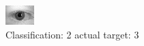 \begin{figure}[h!]
\begin{center}
\includegraphics[width=0.60\columnwidth]{figures/ID626_class_2_target_3.png}
\end{center}
\caption{ Classification: 2 actual target: 3}
\label{fig:ID626_class_2_target_3}
\end{figure}
